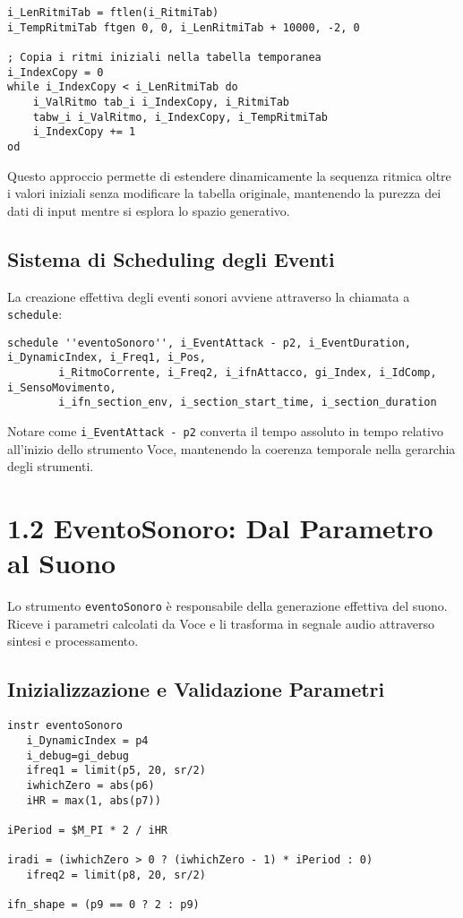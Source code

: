 \begin{lstlisting}[language=Csound]
i_LenRitmiTab = ftlen(i_RitmiTab)
i_TempRitmiTab ftgen 0, 0, i_LenRitmiTab + 10000, -2, 0

; Copia i ritmi iniziali nella tabella temporanea
i_IndexCopy = 0
while i_IndexCopy < i_LenRitmiTab do
    i_ValRitmo tab_i i_IndexCopy, i_RitmiTab
    tabw_i i_ValRitmo, i_IndexCopy, i_TempRitmiTab
    i_IndexCopy += 1
od
\end{lstlisting}

Questo approccio permette di estendere dinamicamente la sequenza ritmica oltre i valori iniziali senza modificare la tabella originale, mantenendo la purezza dei dati di input mentre si esplora lo spazio generativo.
\subsection{Sistema di Scheduling degli Eventi}
La creazione effettiva degli eventi sonori avviene attraverso la chiamata a \texttt{schedule}:

\begin{lstlisting}[language=Csound]
schedule ''eventoSonoro'', i_EventAttack - p2, i_EventDuration, i_DynamicIndex, i_Freq1, i_Pos,
        i_RitmoCorrente, i_Freq2, i_ifnAttacco, gi_Index, i_IdComp, i_SensoMovimento, 
        i_ifn_section_env, i_section_start_time, i_section_duration
\end{lstlisting}

Notare come \texttt{i\_EventAttack - p2} converta il tempo assoluto in tempo relativo all'inizio dello strumento Voce, mantenendo la coerenza temporale nella gerarchia degli strumenti.
\section{1.2 EventoSonoro: Dal Parametro al Suono}
Lo strumento \texttt{eventoSonoro} è responsabile della generazione effettiva del suono. Riceve i parametri calcolati da Voce e li trasforma in segnale audio attraverso sintesi e processamento.
\subsection{Inizializzazione e Validazione Parametri}
\begin{lstlisting}[language=Csound]
instr eventoSonoro
   i_DynamicIndex = p4
   i_debug=gi_debug
   ifreq1 = limit(p5, 20, sr/2)   
   iwhichZero = abs(p6)    
   iHR = max(1, abs(p7))

iPeriod = $M_PI * 2 / iHR

iradi = (iwhichZero > 0 ? (iwhichZero - 1) * iPeriod : 0)
   ifreq2 = limit(p8, 20, sr/2)

ifn_shape = (p9 == 0 ? 2 : p9)
\end{lstlisting}

